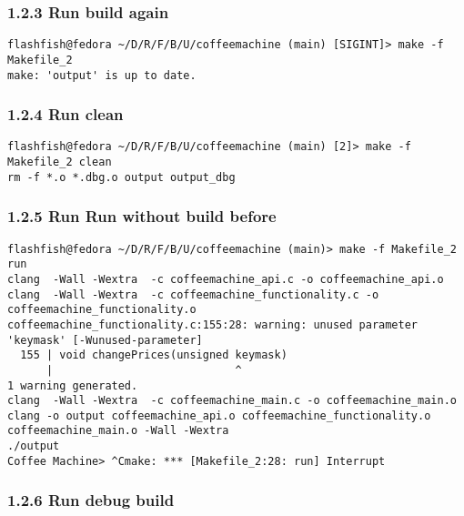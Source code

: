 \documentclass{report}
\begin{document}
\subsubsection*{1.2.3 Run build again}

\begin{lstlisting}[style=cppstyle, title=\texttt{Terminal Output}]
flashfish@fedora ~/D/R/F/B/U/coffeemachine (main) [SIGINT]> make -f Makefile_2
make: 'output' is up to date.
\end{lstlisting}

\subsubsection*{1.2.4 Run clean}

\begin{lstlisting}[style=cppstyle, title=\texttt{Terminal Output}]
flashfish@fedora ~/D/R/F/B/U/coffeemachine (main) [2]> make -f Makefile_2 clean
rm -f *.o *.dbg.o output output_dbg
\end{lstlisting}


\subsubsection*{1.2.5 Run Run without build before}

\begin{lstlisting}[style=cppstyle, title=\texttt{Terminal Output}]
flashfish@fedora ~/D/R/F/B/U/coffeemachine (main)> make -f Makefile_2 run
clang  -Wall -Wextra  -c coffeemachine_api.c -o coffeemachine_api.o
clang  -Wall -Wextra  -c coffeemachine_functionality.c -o coffeemachine_functionality.o
coffeemachine_functionality.c:155:28: warning: unused parameter 'keymask' [-Wunused-parameter]
  155 | void changePrices(unsigned keymask)
      |                            ^
1 warning generated.
clang  -Wall -Wextra  -c coffeemachine_main.c -o coffeemachine_main.o
clang -o output coffeemachine_api.o coffeemachine_functionality.o coffeemachine_main.o -Wall -Wextra
./output
Coffee Machine> ^Cmake: *** [Makefile_2:28: run] Interrupt
\end{lstlisting}

\subsubsection*{1.2.6 Run debug build}
\end{document}
